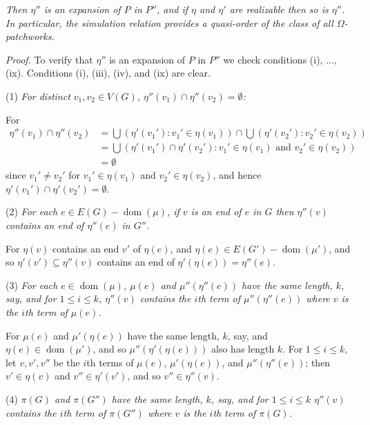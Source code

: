 \textit{Then $\eta''$ is an expansion of $P$ in $P''$, and if $\eta$ and $\eta'$ are realizable then so is $\eta''$. In particular, the simulation relation provides a quasi-order of the class of all $\Omega$-patchworks.}

\textit{Proof.} To verify that $\eta''$ is an expansion of $P$ in $P''$ we check conditions (i), ..., (ix). Conditions (i), (iii), (iv), and (ix) are clear.

\hspace*{12pt}(1) \textit{For distinct $v_1, v_2 \in V(G)$, $\eta''(v_1) \cap \eta''(v_2) = \emptyset$:}

For
\begin{align*}
\eta''(v_1) \cap \eta''(v_2) &= \bigcup (\eta'(v_1') \colon v_1' \in \eta(v_1)) \cap \bigcup (\eta'(v_2') \colon v_2' \in \eta(v_2)) \\
&= \bigcup (\eta'(v_1') \cap \eta'(v_2') \colon v_1' \in \eta(v_1) \text{ and } v_2' \in \eta(v_2)) \\
&= \emptyset
\end{align*}
since $v_1' \neq v_2'$ for $v_1' \in \eta(v_1)$ and $v_2' \in \eta(v_2)$, and hence $\eta'(v_1') \cap \eta'(v_2') = \emptyset$.

\hspace*{12pt}(2) \textit{For each $e \in E(G) - \operatorname{dom}(\mu)$, if $v$ is an end of $e$ in $G$ then $\eta''(v)$ contains an end of $\eta''(e)$ in $G''$.}

For $\eta(v)$ contains an end $v'$ of $\eta(e)$, and $\eta(e) \in E(G') - \operatorname{dom}(\mu')$, and so $\eta'(v') \subseteq \eta''(v)$ contains an end of $\eta'(\eta(e)) = \eta''(e)$.

\hspace*{12pt}(3) \textit{For each $e \in \operatorname{dom}(\mu)$, $\mu(e)$ and $\mu''(\eta''(e))$ have the same length, $k$, say, and for $1 \le i \le k$, $\eta''(v)$ contains the $i$th term of $\mu''(\eta''(e))$ where $v$ is the $i$th term of $\mu(e)$.}

For $\mu(e)$ and $\mu'(\eta(e))$ have the same length, $k$, say, and $\eta(e) \in \operatorname{dom}(\mu')$, and so $\mu''(\eta'(\eta(e)))$ also has length $k$. For $1 \le i \le k$, let $v, v', v''$ be the $i$th terms of $\mu(e)$, $\mu'(\eta(e))$, and $\mu''(\eta''(e))$; then $v' \in \eta(v)$ and $v'' \in \eta'(v')$, and so $v'' \in \eta''(v)$.

\hspace*{12pt}(4) \textit{$\pi(G)$ and $\pi(G'')$ have the same length, $k$, say, and for $1 \le i \le k$ $\eta''(v)$ contains the $i$th term of $\pi(G'')$ where $v$ is the $i$th term of $\pi(G)$.}


